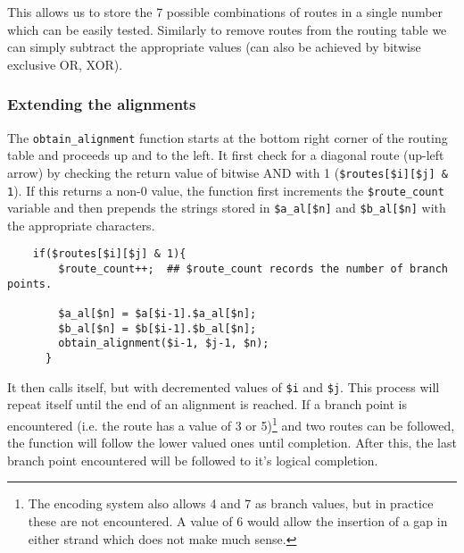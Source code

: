 \documentclass[11pt]{article}
\renewcommand\scriptsize\normalsize
\begin{document}
This allows us to store the 7 possible combinations of routes in a single number
which can be easily tested. Similarly to remove routes from the routing table
we can simply subtract the appropriate values (can also be achieved by bitwise
exclusive OR, XOR).

\subsubsection{Extending the alignments}
\label{sec-1-3-2}
The \texttt{obtain\_alignment} function starts at the bottom right corner
of the routing table and proceeds up and to the left. It first check for
a diagonal route (up-left arrow) by checking the return value of
bitwise AND with 1 (\texttt{\$routes[\$i][\$j] \& 1}). If this returns a
non-0 value, the function first increments the \texttt{\$route\_count} variable
and then prepends the strings stored in \texttt{\$a\_al[\$n]}
and \texttt{\$b\_al[\$n]} with the appropriate characters. 

\begin{verbatim}
    if($routes[$i][$j] & 1){
        $route_count++;  ## $route_count records the number of branch points.

        $a_al[$n] = $a[$i-1].$a_al[$n];
        $b_al[$n] = $b[$i-1].$b_al[$n];
        obtain_alignment($i-1, $j-1, $n); 
      }
\end{verbatim}

It then calls itself, but with decremented values of \verb|$i| and \verb|$j|. This
process will repeat itself until the end of an alignment is reached. If a branch
point is encountered (i.e. the route has a value of 3 or 5)\footnote{The encoding system
also allows 4 and 7 as branch values, but in practice these are not encountered. A value
of 6 would allow the insertion of a gap in either strand which does not make much sense.}
and two routes can be followed, the function will follow the lower valued
ones until completion. After this, the last branch point encountered will be followed
to it's logical completion.
\end{document}
